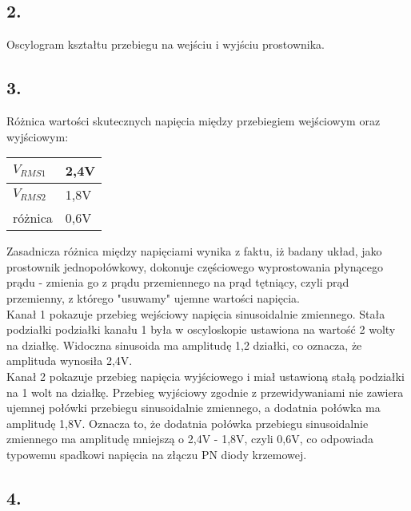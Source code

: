 \documentclass[polish,a4paper]{article}
\begin{document}
\newpage

\subsection*{2.} 

Oscylogram kształtu przebiegu na wejściu i wyjściu prostownika.\\




\subsection*{3.} Różnica wartości skutecznych napięcia między przebiegiem wejściowym oraz wyjściowym:

\begin{center}
\begin{tabular}{|l|l|}
\hline
$V_{RMS1}$ & 2,4V \\
\hline
$V_{RMS2}$ & 1,8V \\ 
\hline
różnica & 0,6V \\
\hline
\end{tabular}
\end{center}

\begin{flushleft}
Zasadnicza różnica między napięciami wynika z faktu, iż badany układ, jako prostownik jednopołówkowy, dokonuje częściowego wyprostowania płynącego prądu - zmienia go z prądu przemiennego na prąd tętniący, czyli prąd przemienny, z którego "usuwamy" ujemne wartości napięcia.\\
Kanał 1 pokazuje przebieg wejściowy napięcia sinusoidalnie zmiennego. Stała podziałki podziałki kanału 1 była w oscyloskopie ustawiona na wartość 2 wolty na działkę. Widoczna sinusoida ma amplitudę 1,2 działki, co oznacza, że amplituda wynosiła 2,4V.\\
Kanał 2 pokazuje przebieg napięcia wyjściowego i miał ustawioną stałą podziałki na 1 wolt na działkę. Przebieg wyjściowy zgodnie z przewidywaniami nie zawiera ujemnej połówki przebiegu sinusoidalnie zmiennego, a dodatnia połówka ma amplitudę 1,8V. Oznacza to, że dodatnia połówka przebiegu sinusoidalnie zmiennego ma amplitudę mniejszą o 2,4V - 1,8V, czyli 0,6V, co odpowiada typowemu spadkowi napięcia na złączu PN diody krzemowej.
 
\end{flushleft}


\subsection*{4.}
\end{document}

